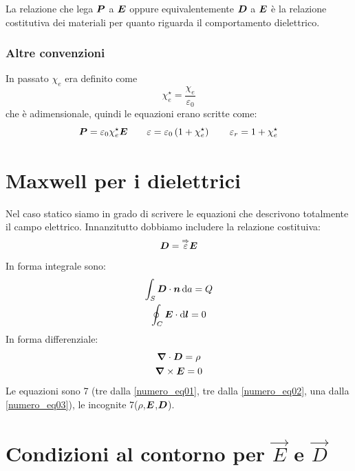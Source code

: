La relazione che lega $\boldsymbol{P}$ a $\boldsymbol{E}$ oppure equivalentemente $\boldsymbol{D}$ a $\boldsymbol{E}$ è la relazione costitutiva dei materiali per quanto riguarda il comportamento dielettrico.
\subsubsection{Altre convenzioni}
In passato $\chi_e$ era definito come
\begin{equation}
\chi_e^\star=\frac{\chi_e}{\varepsilon_0}
\end{equation}
che è adimensionale, quindi le equazioni erano scritte come:
\begin{equation*}
\boldsymbol{P}=\varepsilon_0\chi_e^\star\boldsymbol{E}\qquad\varepsilon=\varepsilon_0\left(1+\chi_e^\star\right)\qquad\varepsilon_r=1+\chi_e^\star\end{equation*}
\section{Maxwell per i dielettrici}
Nel caso statico siamo in grado di scrivere le equazioni che descrivono totalmente il campo elettrico. Innanzitutto dobbiamo includere la relazione costituiva:
\begin{equation}
\boldsymbol{D}=\overset{\Rightarrow}{\varepsilon}\boldsymbol{E}
\label{numero_eq01}
\end{equation}
In forma integrale sono:
\begin{gather}
\int_S\boldsymbol{D}\cdot\boldsymbol{n}\,\mathrm{d} a=Q\\
\oint_C\boldsymbol{E}\cdot\mathrm{d}\boldsymbol{l}=0
\end{gather}
In forma differenziale:
\begin{gather}
\label{numero_eq03}
\boldsymbol{\nabla}\cdot\boldsymbol{D}=\rho\\
\label{numero_eq02}
\boldsymbol{\nabla}\times\boldsymbol{E}=0
\end{gather}
Le equazioni sono 7 (tre dalla \eqref{numero_eq01}, tre dalla \eqref{numero_eq02}, una dalla \eqref{numero_eq03}), le incognite 7($\rho$,$\boldsymbol{E}$,$\boldsymbol{D}$).
\section{Condizioni al contorno per $\vec E$ e $\vec D$}
